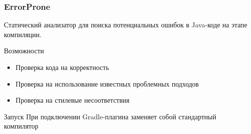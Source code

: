 \documentclass{beamer}
\begin{document}
\begin{frame}
    \frametitle{ErrorProne}
    Статический анализатор для поиска потенциальных ошибок в Java-коде на этапе
    компиляции.
    \begin{block}{Возможности}
        \begin{itemize}
            \item{Проверка кода на корректность}
            \item{Проверка на использование известных проблемных подходов}
            \item{Проверка на стилевые несоответствия}
        \end{itemize}
    \end{block}
    \begin{block}{Запуск}
        При подключении Gradle-плагина заменяет собой стандартный компилятор
    \end{block}
\end{frame}
\end{document}
